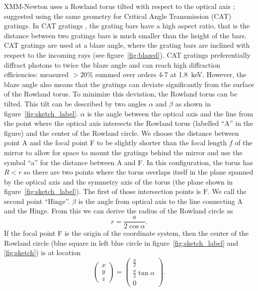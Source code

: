 \documentclass[twocolumn]{aastex631}
\begin{document}
XMM-Newton uses a Rowland torus tilted with respect to the optical axis \citep{2010SSRv..157...15P}; \citet{2010SPIE.7732E..1JH} suggested using the same geometry for Critical Angle Transmission (CAT) gratings. In CAT gratings \citep{2021hai4.book..235H,2022ApJ...934..171H}, the grating bars have a high aspect ratio, that is the distance between two gratings bars is much smaller than the height of the bars. CAT gratings are used at a blaze angle, where the grating bars are inclined with respect to the incoming rays (see figure~\ref{fig:blazed}). CAT gratings preferentially diffract photons to twice the blaze angle and can reach high diffraction efficiencies: \citet{2022ApJ...934..171H} measured $>20$\% summed over orders 4-7 at 1.8~keV. However, the blaze angle also means that the gratings can deviate significantly from the surface of the  Rowland torus. To minimize this deviation, the Rowland torus can be tilted.
This tilt can be described by two angles $\alpha$ and $\beta$ as shown in figure~\ref{fig:sketch_label}. $\alpha$ is the angle between the optical axis and the line from the point where the optical axis intersects the Rowland torus (labelled ``A'' in the figure) and the center of the Rowland circle.  We choose the distance between point A and the focal point F to be slightly shorter than the focal length $f$ of the mirror to allow for space to mount the gratings behind the mirror and use the symbol ``a'' for the distance between A and F.
In this configuration, the torus has $R < r$ so there are two points where the torus overlaps itself in the plane spanned by the optical axis and the symmetry axis of the torus (the plane shown in figure~\ref{fig:sketch_label}). The first of those intersection points is F. We call the second point ``Hinge''.
$\beta$ is the angle from optical axis to the line connecting A and the Hinge. From this we can derive the radius of the Rowland circle as
$$r = \frac{a}{2\cos \alpha}.$$
 If the focal point F is the origin of the coordinate system, then the center of the Rowland circle (blue square in left blue circle in figure~\ref{fig:sketch_label} and \ref{fig:sketch}) is at location
 \begin{equation}
    \begin{pmatrix} x \\ y \\ z \end{pmatrix} =
    \begin{pmatrix} \frac{a}{2} \\ \frac{a}{2}  \tan\alpha \\ 0\end{pmatrix}.
 \end{equation}
\end{document}

